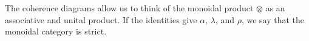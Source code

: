 \documentclass[../thesis.tex]{subfiles}
\begin{document}
\begin{definition}
\begin{center}
{
                }
            \end{center}
        \end{definition}

        The coherence diagrams allow us to think of the monoidal product $\otimes$ as an associative and unital product. If the identities give $\alpha$, $\lambda$, and $\rho$, we say that the monoidal category is strict.
\end{document}
